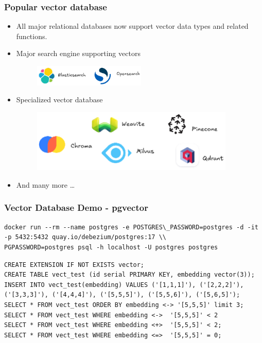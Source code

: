 \documentclass[10pt,utf8]{beamer}
\newenvironment{mylisting}
{\begin{list}{}{\setlength{\leftmargin}{1em}}\item\scriptsize\bfseries}
{\end{list}}
\begin{document}
\begin{frame}
    \frametitle{Popular vector database}
    \begin{itemize}
        \item All major relational databases now support vector data types and related functions.
        \item Major search engine supporting vectors
            \begin{figure}
                \centering
                \includegraphics[height=1cm]{./img/search_engines.eps}
            \end{figure}
        \item Specialized vector database
            \begin{figure}
                \centering
                \includegraphics[height=3cm]{./img/vector_databases.eps}
            \end{figure}
        \item And many more \dots
    \end{itemize}
\end{frame}

\begin{frame}[fragile]
    \frametitle{Vector Database Demo - pgvector}
    \begin{mylisting}
        \begin{lstlisting}
docker run --rm --name postgres -e POSTGRES\_PASSWORD=postgres -d -it -p 5432:5432 quay.io/debezium/postgres:17 \\
PGPASSWORD=postgres psql -h localhost -U postgres postgres
        \end{lstlisting}
    \end{mylisting}

    \vspace{0.5cm}
    
    \begin{mylisting}
        \begin{lstlisting}
CREATE EXTENSION IF NOT EXISTS vector;
CREATE TABLE vect_test (id serial PRIMARY KEY, embedding vector(3));
INSERT INTO vect_test(embedding) VALUES ('[1,1,1]'), ('[2,2,2]'), 
('[3,3,3]'), ('[4,4,4]'), ('[5,5,5]'), ('[5,5,6]'), ('[5,6,5]');
SELECT * FROM vect_test ORDER BY embedding <-> '[5,5,5]' limit 3;
SELECT * FROM vect_test WHERE embedding <->  '[5,5,5]' < 2
SELECT * FROM vect_test WHERE embedding <+>  '[5,5,5]' < 2;
SELECT * FROM vect_test WHERE embedding <=>  '[5,5,5]' = 0;
        \end{lstlisting}
    \end{mylisting}
\end{frame}
\end{document}
